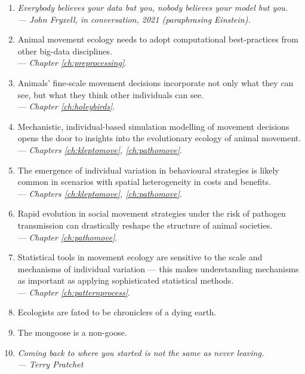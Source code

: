 \begin{onehalfspace}
    \begin{enumerate}
        \item \textit{Everybody believes your data but you, nobody believes your model but you.\\ --- John Fryxell, in conversation, 2021 (paraphrasing Einstein).}

        \item Animal movement ecology needs to adopt computational best-practices from other big-data disciplines.\\ --- \textit{Chapter \ref{ch:preprocessing}}.

        \item Animals' fine-scale movement decisions incorporate not only what they can see, but what they think other individuals can see.\\ --- \textit{Chapter \ref{ch:holeybirds}}.

        \item Mechanistic, individual-based simulation modelling of movement decisions opens the door to insights into the evolutionary ecology of animal movement. \\ --- \textit{Chapters \ref{ch:kleptomove}, \ref{ch:pathomove}}.
        
        \item The emergence of individual variation in behavioural strategies is likely common in scenarios with spatial heterogeneity in costs and benefits.\\ --- \textit{Chapters \ref{ch:kleptomove}, \ref{ch:pathomove}}.

        \item Rapid evolution in social movement strategies under the risk of pathogen transmission can drastically reshape the structure of animal societies.\\ --- \textit{Chapter \ref{ch:pathomove}}.
        
        \item Statistical tools in movement ecology are sensitive to the scale and mechanisms of individual variation --- this makes understanding mechanisms as important as applying sophisticated statistical methods.\\ --- \textit{Chapter \ref{ch:patternprocess}}.
        
        \item Ecologists are fated to be chroniclers of a dying earth.
        
        \item The mongoose is a non-goose.

        \item \textit{Coming back to where you started is not the same as never leaving.\\--- Terry Pratchet}
    \end{enumerate}

\end{onehalfspace}

{ \begin{center}  \end{center} }

\endgroup

\vfill

\clearpage

